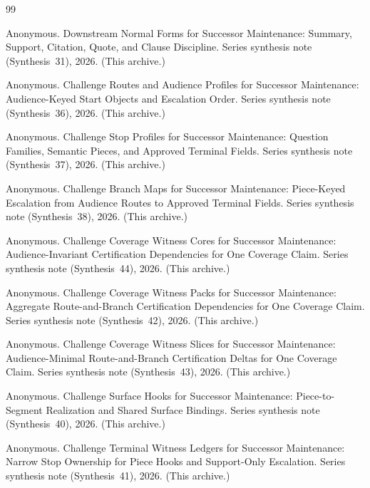 \documentclass[11pt]{article}
\begin{document}
\begin{thebibliography}{99}\small

Anonymous.
\newblock Downstream Normal Forms for Successor Maintenance: Summary, Support, Citation, Quote, and Clause Discipline.
\newblock Series synthesis note (Synthesis~31), 2026. (This archive.)

Anonymous.
\newblock Challenge Routes and Audience Profiles for Successor Maintenance: Audience-Keyed Start Objects and Escalation Order.
\newblock Series synthesis note (Synthesis~36), 2026. (This archive.)

Anonymous.
\newblock Challenge Stop Profiles for Successor Maintenance: Question Families, Semantic Pieces, and Approved Terminal Fields.
\newblock Series synthesis note (Synthesis~37), 2026. (This archive.)

Anonymous.
\newblock Challenge Branch Maps for Successor Maintenance: Piece-Keyed Escalation from Audience Routes to Approved Terminal Fields.
\newblock Series synthesis note (Synthesis~38), 2026. (This archive.)


Anonymous.
\newblock Challenge Coverage Witness Cores for Successor Maintenance: Audience-Invariant Certification Dependencies for One Coverage Claim.
\newblock Series synthesis note (Synthesis~44), 2026. (This archive.)

Anonymous.
\newblock Challenge Coverage Witness Packs for Successor Maintenance: Aggregate Route-and-Branch Certification Dependencies for One Coverage Claim.
\newblock Series synthesis note (Synthesis~42), 2026. (This archive.)

Anonymous.
\newblock Challenge Coverage Witness Slices for Successor Maintenance: Audience-Minimal Route-and-Branch Certification Deltas for One Coverage Claim.
\newblock Series synthesis note (Synthesis~43), 2026. (This archive.)

Anonymous.
\newblock Challenge Surface Hooks for Successor Maintenance: Piece-to-Segment Realization and Shared Surface Bindings.
\newblock Series synthesis note (Synthesis~40), 2026. (This archive.)

Anonymous.
\newblock Challenge Terminal Witness Ledgers for Successor Maintenance: Narrow Stop Ownership for Piece Hooks and Support-Only Escalation.
\newblock Series synthesis note (Synthesis~41), 2026. (This archive.)


\end{thebibliography}
\end{document}
